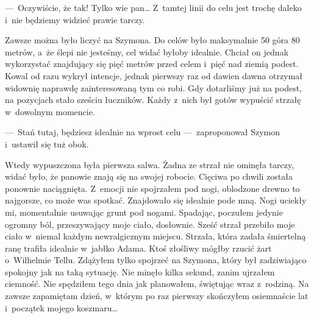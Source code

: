 ---~Oczywiście, że tak! Tylko wie pan… Z~tamtej linii do celu jest trochę daleko i~nie będziemy widzieć prawie tarczy.

Zawsze można było liczyć na Szymona. Do celów było maksymalnie 50 góra 80 metrów, a~że ślepi nie jesteśmy, cel widać byłoby idealnie. Chciał on jednak wykorzystać znajdujący się pięć metrów przed celem i~pięć nad ziemią podest. Kowal od razu wykrył intencje, jednak pierwszy raz od dawien dawna otrzymał widownię naprawdę zainteresowaną tym co robi.
Gdy dotarliśmy już na podest, na pozycjach stało sześciu łuczników. Każdy z~nich był gotów wypuścić strzałę w~dowolnym momencie.

---~Stań tutaj, będziesz idealnie na wprost celu ---~zaproponował Szymon i~ustawił się tuż obok.

Wtedy wypuszczona była pierwsza salwa. Żadna ze strzał nie ominęła tarczy, widać było, że panowie znają się na swojej robocie. Cięciwa po chwili została ponownie naciągnięta. Z~emocji nie spojrzałem pod nogi, oblodzone drewno to najgorsze, co może was spotkać. Znajdowało się idealnie pode mną. Nogi uciekły mi, momentalnie usuwając grunt pod nogami. Spadając, poczułem jedynie ogromny ból, przeszywający moje ciało, dosłownie. Sześć strzał przebiło moje ciało w~niemal każdym newralgicznym miejscu. Strzała, która zadała śmiertelną ranę trafiła idealnie w~jabłko Adama. Ktoś złośliwy mógłby rzucić żart o~Wilhelmie Tellu. Zdążyłem tylko spojrzeć na Szymona, który był zadziwiająco spokojny jak na taką sytuację. Nie minęło kilka sekund, zanim ujrzałem ciemność. Nie spędziłem tego dnia jak planowałem, świętując wraz z~rodziną. Na zawsze zapamiętam dzień, w~którym po raz pierwszy skończyłem osiemnaście lat i~początek mojego koszmaru…

